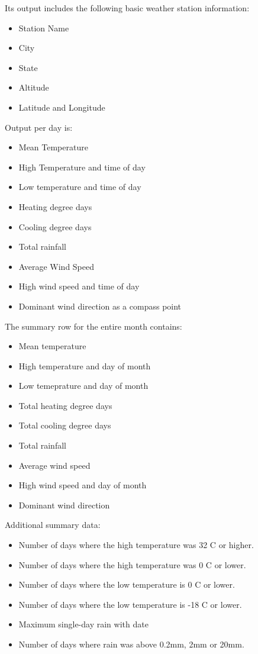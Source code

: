 \documentclass[a4paper,10pt]{book}
\begin{document}
 Its output includes the following basic weather station information:
\begin{itemize}
\item Station Name
\item City
\item State
\item Altitude
\item Latitude and Longitude
\end{itemize}

Output per day is:
\begin{itemize}
\item Mean Temperature
\item High Temperature and time of day
\item Low temperature and time of day
\item Heating degree days
\item Cooling degree days
\item Total rainfall
\item Average Wind Speed
\item High wind speed and time of day
\item Dominant wind direction as a compass point
\end{itemize}

The summary row for the entire month contains:
\begin{itemize}
\item Mean temperature
\item High temperature and day of month
\item Low temeprature and day of month
\item Total heating degree days
\item Total cooling degree days
\item Total rainfall
\item Average wind speed
\item High wind speed and day of month
\item Dominant wind direction
\end{itemize}

Additional summary data:
\begin{itemize}
\item Number of days where the high temperature was 32 \degree C or higher.
\item Number of days where the high temperature was 0 \degree C or lower.
\item Number of days where the low temperature is 0 \degree C or lower.
\item Number of days where the low temperature is -18 \degree C or lower.
\item Maximum single-day rain with date
\item Number of days where rain was above 0.2mm, 2mm or 20mm.
\end{itemize}
\end{document}
